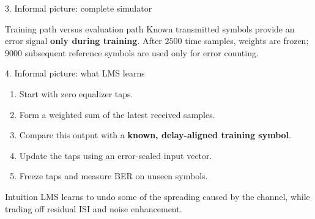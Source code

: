 \documentclass[aspectratio=169,11pt]{beamer}
\begin{document}
\begin{frame}{3. Informal picture: complete simulator}
\centering
{}
\vspace{0.65cm}
\begin{block}{Training path versus evaluation path}
Known transmitted symbols provide an error signal \textbf{only during training}. After $2500$ time samples, weights are frozen; $9000$ subsequent reference symbols are used only for error counting.
\end{block}
\medskip
{}
\end{frame}

\begin{frame}{4. Informal picture: what LMS learns}
\begin{enumerate}\setlength{\itemsep}{10pt}
\item Start with zero equalizer taps.
\item Form a weighted sum of the latest received samples.
\item Compare this output with a \textbf{known, delay-aligned training symbol}.
\item Update the taps using an error-scaled input vector.
\item Freeze taps and measure BER on unseen symbols.
\end{enumerate}
\vspace{0.3cm}
\begin{block}{Intuition}
LMS learns to undo some of the spreading caused by the channel, while trading off residual ISI and noise enhancement.
\end{block}
\end{frame}
\end{document}
